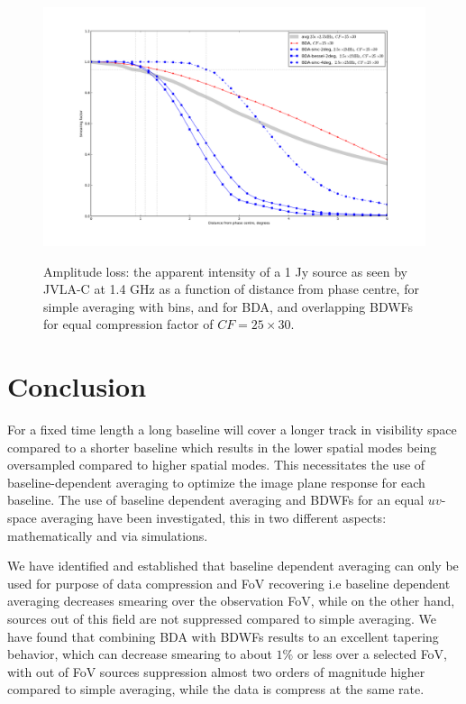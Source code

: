 \documentclass[useAMS,usenatbib]{mn2e}
\begin{document}
\begin{figure}
\centering
\includegraphics[width=.9\textwidth]{./Figures/suppression-25-2-5MHx-bda.png}\\
\caption{Amplitude loss: the apparent intensity of a 1 Jy source as seen by JVLA-C at 1.4 GHz as a function of distance from phase centre, for simple averaging with  bins, and for BDA, and overlapping BDWFs for equal 
compression factor of $CF=25\times 30$.}\label{fig:bda-sn-bessel-2ge}
\end{figure}


\section{Conclusion}
 For a fixed time length a long baseline will cover a
longer track in visibility space compared to a shorter baseline which results in
the lower spatial modes being oversampled compared to higher spatial modes.
This necessitates the use of baseline-dependent averaging to optimize the
image plane response for each baseline. The use of baseline dependent 
averaging and BDWFs for an equal $uv$-space averaging have been investigated, this in two different aspects: 
mathematically and  via simulations.

We have identified and established that baseline dependent averaging 
can only be used for purpose of data compression and FoV recovering i.e baseline dependent averaging
decreases smearing over the observation FoV, while on the other hand, sources out of this field are 
not suppressed compared to simple averaging. 
We have found that combining BDA with BDWFs results to an  excellent tapering behavior,
which can decrease smearing to about $1\%$ or less over a selected  FoV, with  out of FoV sources suppression
almost two orders of magnitude higher compared to simple averaging, while the data is compress at the same rate.
\end{document}
